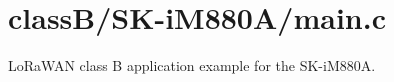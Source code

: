 \hypertarget{classB_2SK-iM880A_2main_8c-example}{}\section{class\+B/\+S\+K-\/i\+M880\+A/main.\+c}
Lo\+Ra\+W\+AN class B application example for the S\+K-\/i\+M880A.


\begin{DoxyCodeInclude}
\end{DoxyCodeInclude}
 